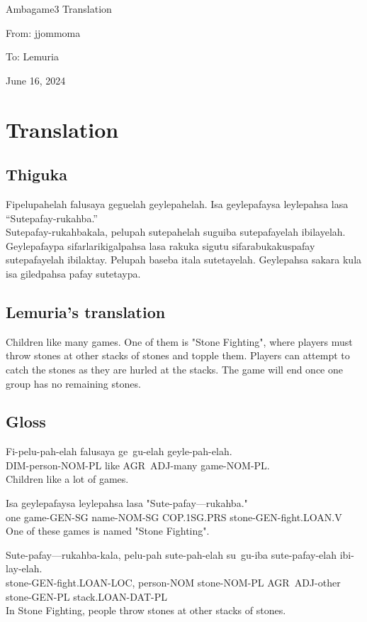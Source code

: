 \documentclass{thiguka}
\begin{document}
Ambagame3 Translation

From: jjommoma

To: Lemuria

June 16, 2024

\section{Translation}
\subsection{Thiguka}
Fipelupahelah falusaya geguelah geylepahelah.
Isa geylepafaysa leylepahsa lasa “Sutepafay-rukahba.”\\
Sutepafay-rukahbakala, pelupah sutepahelah suguiba sutepafayelah ibilayelah.
Geylepafaypa sifarlarikigalpahsa lasa rakuka sigutu sifarabukakuspafay sutepafayelah ibilaktay.
Pelupah baseba itala sutetayelah.
Geylepahsa sakara kula isa giledpahsa pafay sutetaypa.

\subsection{Lemuria's translation}
Children like many games.
One of them is "Stone Fighting", where players must throw stones at other stacks of stones and topple them.
Players can attempt to catch the stones as they are hurled at the stacks.
The game will end once one group has no remaining stones.

\subsection{Gloss}

\begin{exe}
\ex{} \gll{}Fi-pelu-pah-elah falusaya ge~gu-elah geyle-pah-elah.\\
            DIM-person-NOM-PL like AGR~ADJ-many game-NOM-PL.\\
      \glt{}Children like a lot of games.
\end{exe}

\begin{exe}
\ex{} \gll{}Isa geylepafaysa leylepahsa lasa "Sute-pafay---rukahba."\\
            one game-GEN-SG name-NOM-SG COP.1SG.PRS stone-GEN-fight.LOAN.V\\
      \glt{}One of these games is named "Stone Fighting".
\end{exe}

\begin{exe}
\ex{} \gll{}Sute-pafay---rukahba-kala, pelu-pah sute-pah-elah su~gu-iba sute-pafay-elah ibi-lay-elah.\\
            stone-GEN-fight.LOAN-LOC, person-NOM stone-NOM-PL AGR~ADJ-other stone-GEN-PL stack.LOAN-DAT-PL\\
      \glt{}In Stone Fighting, people throw stones at other stacks of stones.
\end{exe}
\end{document}
